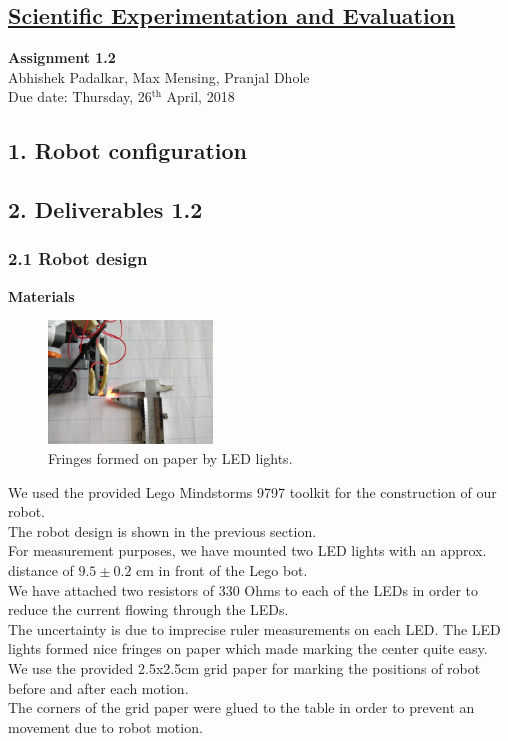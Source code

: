\documentclass[11pt,a4paper,openright,twoside]{extreport}
\begin{document}
\begin{center}
\section*{\underline{Scientific Experimentation and Evaluation}}

\large{\textbf{Assignment 1.2}}\\
\large{Abhishek Padalkar, Max Mensing, Pranjal Dhole}\\
\large{Due date: Thursday, 26$^{\text{th}}$ April, 2018}
\end{center}

\subsection*{1. Robot configuration}
\label{robot-config}
\subsection*{2. Deliverables 1.2}
\subsubsection*{2.1 Robot design}
\textbf{Materials}
\begin{figure}
  \vspace{-50pt}
  \begin{center}
    \includegraphics[width=0.39\textwidth]{fringe.jpeg}
  \end{center}
  \vspace{-20pt}
  \caption{Fringes formed on paper by LED lights.}
\end{figure}

We used the provided Lego Mindstorms 9797 toolkit for the construction of our robot.\\
The robot design is shown in the previous section.\\
For measurement purposes, we have mounted two LED lights with an approx. distance of $9.5 \pm 0.2$ cm in front of the Lego bot. \\
We have attached two resistors of 330 Ohms to each of the LEDs in order to reduce the current flowing through the LEDs. \\
The uncertainty is due to imprecise ruler measurements on each LED. The LED lights formed nice fringes on paper which made marking the center quite easy.\\
We use the provided  2.5x2.5cm grid paper for marking the positions of robot before and after each motion.\\
The corners of the grid paper were glued to the table in order to prevent an movement due to robot motion. 
\end{document}
